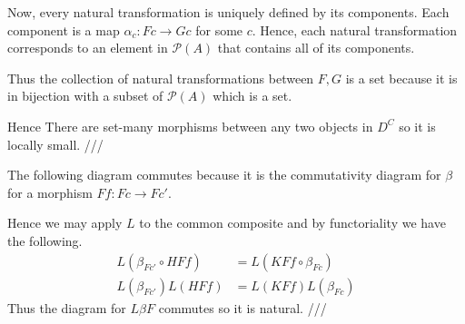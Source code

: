 \documentclass[12pt]{article}
\newcommand{\exercise}[1]{\fbox{\textbf{Exercise #1}}}
\newcommand{\ra}{\rightarrow}
\renewcommand{\P}{\mathcal{P}}
\begin{document}
  Now, every natural transformation is uniquely defined by its components. Each component is a map $\alpha_c : Fc \ra Gc$ for some $c$. Hence, each natural transformation corresponds to an element in $\P(A)$ that contains all of its components. 

  Thus the collection of natural transformations between $F,G$ is a set because it is in bijection with a subset of $\P(A)$ which is a set.
  
  Hence There are set-many morphisms between any two objects in $D^C$ so it is locally small. ///
  
  



  




  \exercise{1.7.ii} The following diagram commutes because it is the commutativity diagram for $\beta$ for a morphism $Ff : Fc \ra Fc'$. 
  \begin{center}
  \end{center}

  Hence we may apply $L$ to the common composite and by functoriality we have the following.
  \begin{align*}
    L(\beta_{Fc'} \circ HFf) &= L(KFf \circ \beta_{Fc}) \\
    L(\beta_{Fc'})L(HFf) &= L(KFf)L(\beta_{Fc})
  \end{align*}
  Thus the diagram for $L\beta F$ commutes so it is natural. ///
\end{document}
